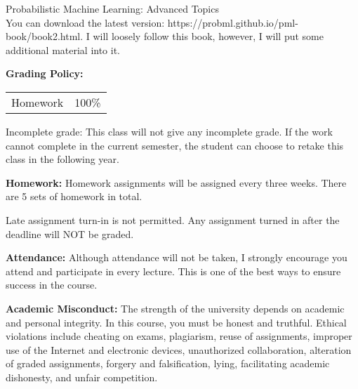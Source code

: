 \documentclass[a4paper,10pt]{article}
\begin{document}
Probabilistic Machine Learning: Advanced Topics \\
You can download the latest version: https://probml.github.io/pml-book/book2.html. 
 I will loosely follow this book, however, I will put some additional material into it. 


\textbf{Grading Policy:}

\begin{tabular}{lr}
Homework & 100\%\\
\end{tabular}


Incomplete grade: This class will not give any
incomplete grade. If the work cannot complete in the
current semester, the student can choose to retake this
class in the following year.






\textbf{Homework:} Homework assignments will be assigned every three weeks. There are 5 sets of homework in total. 

Late assignment turn-in is not permitted. Any assignment turned in after the deadline will NOT be graded.




\textbf{Attendance:} Although attendance will not be taken, I strongly encourage you attend and participate in every lecture. This is one of the best ways to ensure success in the course.






\textbf{Academic Misconduct:} The strength of the university depends on academic and personal integrity. In this course, you must be honest 
and truthful. Ethical violations include cheating on exams, plagiarism, reuse of assignments, improper use 
of the Internet and electronic devices, unauthorized collaboration, alteration of graded assignments, forgery 
and falsification, lying, facilitating academic dishonesty, and unfair competition.
\end{document}
